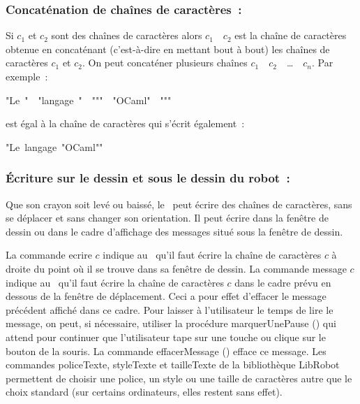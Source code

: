 \subsubsection{Concaténation de chaînes de caractères~:}
Si $c_{1}$ et $c_{2}$ sont des chaînes de
caractères alors $c_{1}$\ {\idt {}}\ $c_{2}$ est la chaîne de
caractères obtenue en concaténant (c'est-à-dire en mettant bout à bout) les chaînes de
caractères $c_{1}$ et $c_{2}$. On peut concaténer plusieurs chaînes
$c_{1}$\ {\idt {}}\ $c_{2}$\ {\idt {}}\ \ldots\ {\idt {}}\ $c_{n}$. Par exemple~:
\begin{center}
{\cha "Le\ "}\ {\idt {}}\ {\cha "langage\ "}\ {\idt {}}\ {\cha """}\
{\idt {}}\ {\cha "OCaml"}\ {\idt {}}\ {\cha """}
\end{center}
est égal à la chaîne de caractères qui s'écrit également~:
\begin{center}
{\cha "Le\ langage\ "OCaml""}
\end{center}

\subsubsection{Écriture sur le dessin et sous le dessin du robot~:}
Que son crayon soit levé ou baissé, le \robot\ peut écrire des chaînes de ca\-rac\-tè\-res,
sans se déplacer et sans changer son orientation. Il peut écrire dans la fenêtre de dessin ou dans le cadre d'affichage des
messages situé sous la fenêtre de dessin.

La commande {\idt ecrire $c$} indique au \robot\ qu'il faut écrire la chaîne de caractères $c$ à droite du point
où il se trouve dans sa fenêtre de dessin.
La commande {\idt message $c$} indique au \robot\ qu'il faut écrire la chaîne de ca\-rac\-tè\-res $c$ dans le
cadre prévu en dessous de la fenêtre de déplacement. Ceci a pour effet d'effacer le message précédent
affiché dans ce
cadre. Pour laisser à l'utilisateur le temps de lire le message, on peut, si nécessaire, utiliser la procédure
{\idt  marquerUnePause ()} qui attend pour continuer que l'utilisateur tape sur une touche ou clique sur le bouton de la
souris. La commande {\idt  effacerMessage ()} efface ce message. Les commandes {\idt policeTexte},
{\idt styleTexte} et {\idt tailleTexte} de la bibliothèque {\idt LibRobot} permettent de choisir une police,
un style ou une taille de caractères autre que le choix standard (sur certains ordinateurs, elles restent
sans effet).

